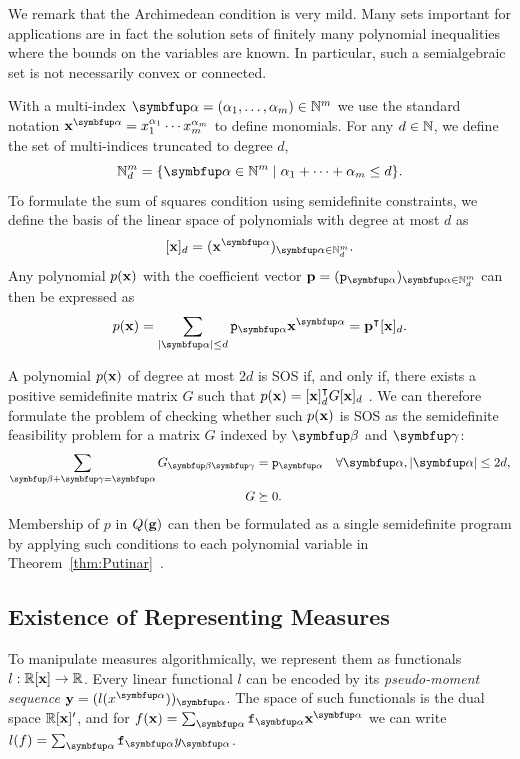 We remark that the Archimedean condition is very mild. Many sets important for applications are in fact the solution sets of finitely many polynomial inequalities where the bounds on the variables are known. In particular, such a semialgebraic set is not necessarily convex or connected.

With a multi-index $\balpha=(\alpha_1,\dots,\alpha_{m})\in\N^{m}$ we use the standard notation $\bx^{\balpha}=x_1^{\alpha_1}\dotsb x_{m}^{\alpha_{m}}$ to define monomials. For any $d\in \mathbb{N}$, we define the set of multi-indices truncated to degree $d$,
\[
    \N^{m}_d=\{\balpha \in \N^{m} \mid \alpha_1+\dots + \alpha_{m} \le d\}.
\]
To formulate the sum of squares condition using semidefinite constraints, we define the basis of the linear space of polynomials with degree at most $d$ as
\[
    [\bx]_d=(\bx^{\balpha})_{\balpha\in \N^{m}_d}.
\]
Any polynomial $p(\mathbf{x})$ with the coefficient vector $\mathbf{p}=(\coeff{p}_{\balpha})_{\balpha\in \N^{m}_d}$ can then be expressed as
\[
    p(\bx) = \sum_{|\balpha|\le d} \coeff{p}_{\balpha} \bx^{\balpha} = \mathbf{p}^\intercal[\bx]_{d}.
\]

A polynomial $p(\mathbf{x})$ of degree at most $2d$ is SOS if, and only if, there exists a positive semidefinite matrix $G$ such that $p(\mathbf{x})=[\mathbf{x}]_d^\intercal G [\mathbf{x}]_d$ \cite[Proposition 2.1]{Lasserre15:book}. We can therefore formulate the problem of checking whether such $p(\mathbf{x})$ is SOS as the semidefinite feasibility problem for a matrix $G$ indexed by $\bbeta$ and $\bgamma$:
\begin{equation*}
    \begin{aligned}
       \sum\limits_{\bbeta+\bgamma=\balpha} G_{\bbeta\bgamma} &= \coeff{p}_{\balpha}  \quad \forall \balpha, |\balpha|\le 2d,\\
G &\succeq 0.
    \end{aligned}
\end{equation*}
Membership of $p$ in $Q(\mathbf{g})$ can then be formulated as a single semidefinite program by applying such conditions to each polynomial variable in Theorem~\ref{thm:Putinar}~\cite[Chapter 2.4.2]{Lasserre15:book}.

\subsection{Existence of Representing Measures}
To manipulate measures algorithmically, we represent them as functionals $l: \mathbb{R}[\mathbf{x}] \to \mathbb{R}$. Every linear functional $l$ can be encoded by its \emph{pseudo-moment sequence} \(\mathbf{y} = (l(x^{\balpha}))_{\balpha}\). The space of such functionals is the dual space \(\mathbb{R}[\mathbf{x}]'\), and for $f(\bx) = \sum_{\balpha} \coeff{f}_{\balpha} \bx^{\balpha}$ we can write \(l(f) = \sum_{\balpha} \coeff{f}_{\balpha} y_{\balpha}\).

